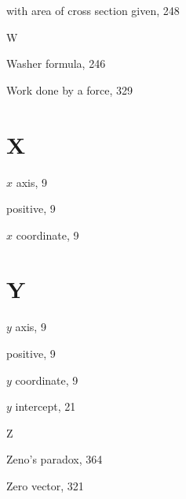 \documentclass[10pt]{article}
\begin{document}
with area of cross section given, 248

W

Washer formula, 246

Work done by a force, 329

\section*{$\mathbf{X}$}
$x$ axis, 9

positive, 9

$x$ coordinate, 9

\section*{$\mathbf{Y}$}
$y$ axis, 9

positive, 9

$y$ coordinate, 9

$y$ intercept, 21

Z

Zeno's paradox, 364

Zero vector, 321
\end{document}
